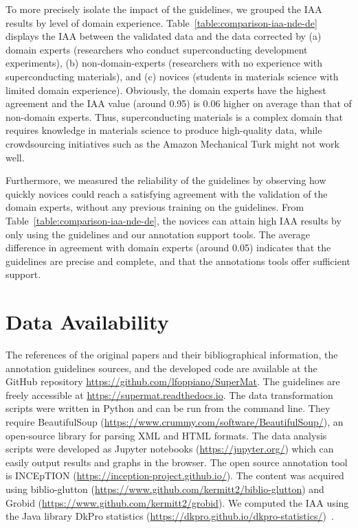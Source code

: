 To more precisely isolate the impact of the guidelines, we grouped the IAA results by level of domain experience. 
Table~\ref{table:comparison-iaa-nde-de} displays the IAA between the validated data and the data corrected by (a) domain experts (researchers who conduct superconducting development experiments), (b) non-domain-experts (researchers with no experience with superconducting materials), and (c) novices (students in materials science with limited domain experience). 
Obviously, the domain experts have the highest agreement and the IAA value (around 0.95) is 0.06 higher on average than that of non-domain experts. 
Thus, superconducting materials is a complex domain that requires knowledge in materials science to produce high-quality data, while crowdsourcing initiatives such as the Amazon Mechanical Turk might not work well. 

Furthermore, we measured the reliability of the guidelines by observing how quickly novices could reach a satisfying agreement with the validation of the domain experts, without any previous training on the guidelines.
From Table~\ref{table:comparison-iaa-nde-de}, the  novices can attain high IAA results by only using the guidelines and our annotation support tools. 
The average difference in agreement with domain experts (around 0.05) indicates that the guidelines are precise and complete, and that the annotations tools offer sufficient support. 

\section{Data Availability}
\label{sec:code-availability}
The references of the original papers and their bibliographical information, the annotation guidelines sources, and the developed code are available at the GitHub repository \url{https://github.com/lfoppiano/SuperMat}. The guidelines are freely accessible at \url{https://supermat.readthedocs.io}.
The data transformation scripts were written in Python and can be run from the command line. 
They require BeautifulSoup  (\url{https://www.crummy.com/software/BeautifulSoup/}), an open-source library for parsing XML and HTML formats. 
The data analysis scripts were developed as Jupyter notebooks (\url{https://jupyter.org/}) which can easily output results and graphs in the browser. 
The open source annotation tool is INCEpTION (\url{https://inception-project.github.io/}). 
The content was acquired using biblio-glutton (\url{https://www.github.com/kermitt2/biblio-glutton}) and Grobid (\url{https://www.github.com/kermitt2/grobid}).
We computed the IAA using the Java library DkPro statistics (\url{https://dkpro.github.io/dkpro-statistics/})~\cite{Meyer2014DKProAA}.

